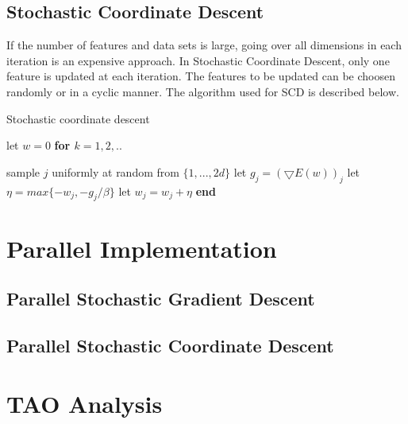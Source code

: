 \documentclass{sigplanconf}
\newlength\myindent
\newcommand\bindent{%
  \begingroup
  \setlength{\itemindent}{\myindent}
  \addtolength{\algorithmicindent}{\myindent}
}
\newcommand\eindent{\endgroup}
\begin{document}
\subsection{Stochastic Coordinate Descent}
If the number of features and data sets is large, going over all dimensions in each iteration is an
expensive approach. In Stochastic Coordinate Descent, only one feature is updated at each iteration. The 
features to be updated can be choosen randomly or in a cyclic manner. The algorithm used for SCD is 
described below.

\begin{algorithm}
\caption{Stochastic coordinate descent}
\begin{algorithmic} 
\STATE let $w = 0$
\STATE \bf{for} \begin{math} k = 1,2,.. \end{math}
    \bindent
	\STATE \textnormal{sample \begin{math}j\end{math} uniformly at random from \begin{math}\{1,...,2d\}\end{math}}
	\STATE \textnormal{let \begin{math}g_j = (\bigtriangledown{E(w)})_j\end{math}}
	\STATE \textnormal{let \begin{math}\eta = max\{ -w_j, -g_j/\beta \}\end{math}}
	\STATE \textnormal{let \begin{math}w_j = w_j + \eta\end{math}}
    \eindent
\STATE \bf{end}
\end{algorithmic}
\end{algorithm}

\section{Parallel Implementation}
\subsection{Parallel Stochastic Gradient Descent}
\subsection{Parallel Stochastic Coordinate Descent}

\section{TAO Analysis}
\end{document}
